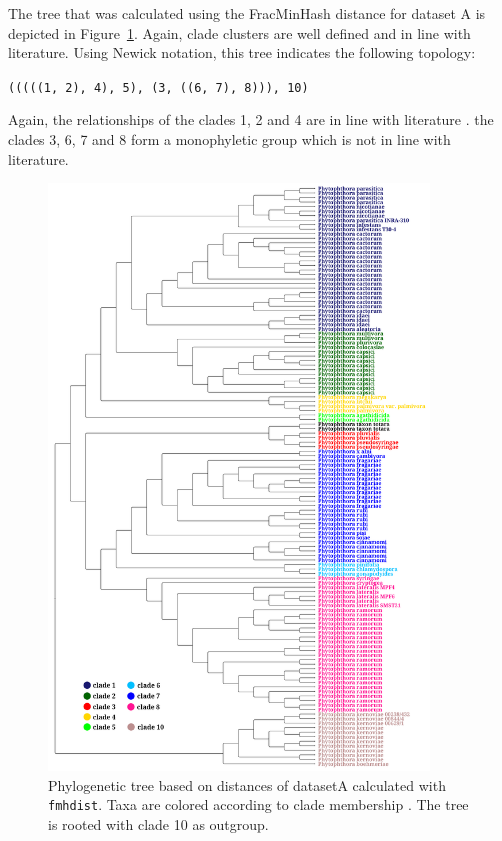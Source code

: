 The tree that was calculated using the FracMinHash distance for dataset A is
depicted in Figure~\ref{fig:mandalFmhdistTree}. Again, clade clusters are well
defined and in line with literature.
Using Newick notation, this tree indicates the following topology:

\texttt{(((((1, 2), 4), 5), (3, ((6, 7), 8))), 10)}

Again, the relationships of the clades 1, 2 and 4 are in line with literature
\cite{abadPhytophthoraTaxonomicPhylogenetic2023a,yangExpandedPhylogenyGenus2017}.
the clades 3, 6, 7 and 8 form a monophyletic group which is not in line with
literature.

\begin{figure}
  \centering
  \includegraphics[width=0.9\textwidth]{figures/fmhdist_mandal_tree_k21_s2000.png}
  \caption{Phylogenetic tree based on distances of datasetA calculated with
  \texttt{fmhdist}. Taxa are colored according to clade membership
  \cite{abadPhytophthoraTaxonomicPhylogenetic2023a}. The tree is rooted with
  clade 10 as outgroup.}
  \label{fig:mandalFmhdistTree}
\end{figure}

